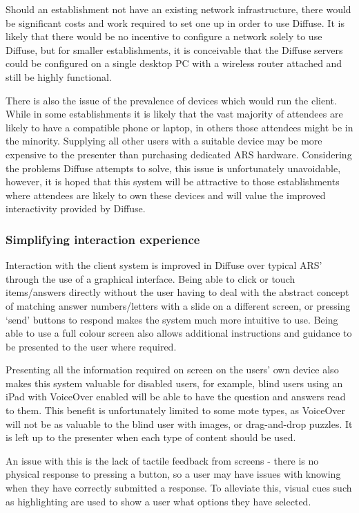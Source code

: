 \documentclass[a4papert,11pt,notitlepage]{ltxdoc}
\begin{document}
Should an establishment not have an existing network infrastructure, there would be significant costs and work required to set one up in order to use Diffuse. It is likely that there would be no incentive to configure a network solely to use Diffuse, but for smaller establishments, it is conceivable that the Diffuse servers could be configured on a single desktop PC with a wireless router attached and still be highly functional.

There is also the issue of the prevalence of devices which would run the client. While in some establishments it is likely that the vast majority of attendees are likely to have a compatible phone or laptop, in others those attendees might be in the minority. Supplying all other users with a suitable device may be more expensive to the presenter than purchasing dedicated ARS hardware. Considering the problems Diffuse attempts to solve, this issue is unfortunately unavoidable, however, it is hoped that this system will be attractive to those establishments where attendees are likely to own these devices and will value the improved interactivity provided by Diffuse.

\subsubsection{Simplifying interaction experience}
Interaction with the client system is improved in Diffuse over typical ARS' through the use of a graphical interface. Being able to click or touch items/answers directly without the user having to deal with the abstract concept of matching answer numbers/letters with a slide on a different screen, or pressing `send' buttons to respond makes the system much more intuitive to use. Being able to use a full colour screen also allows additional instructions and guidance to be presented to the user where required.

Presenting all the information required on screen on the users' own device also makes this system valuable for disabled users, for example, blind users using an iPad with VoiceOver enabled will be able to have the question and answers read to them. This benefit is unfortunately limited to some mote types, as VoiceOver will not be as valuable to the blind user with images, or drag-and-drop puzzles. It is left up to the presenter when each type of content should be used.

An issue with this is the lack of tactile feedback from screens - there is no physical response to pressing a button, so a user may have issues with knowing when they have correctly submitted a response. To alleviate this, visual cues such as highlighting are used to show a user what options they have selected.
\end{document}
